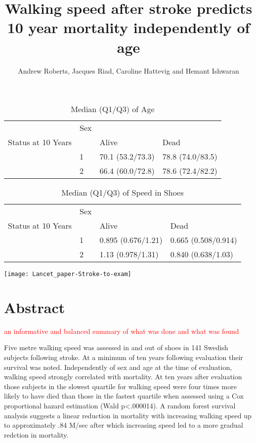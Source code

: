 \documentclass[a4paper,12pt]{article}
\author{Andrew Roberts, Jacques Riad, Caroline Hattevig and Hemant Ishwaran}
\title{Walking speed after stroke predicts 10 year mortality independently of age}
\begin{document}
\maketitle
\newpage


\begin{table}[ht]
\centering
\caption{Median (Q1/Q3) of Age} 
\begin{tabular}{llll}
  \hline
  \hline
 & Sex &  &  \\ 
  Status at 10 Years &  & Alive & Dead \\ 
   & 1 & 70.1 (53.2/73.3) & 78.8 (74.0/83.5) \\ 
   & 2 & 66.4 (60.0/72.8) & 78.6 (72.4/82.2) \\ 
   \hline
\end{tabular}
\end{table}%
\begin{table}[ht]
\centering
\caption{Median (Q1/Q3) of Speed in Shoes} 
\begin{tabular}{llll}
  \hline
  \hline
 & Sex &  &  \\ 
  Status at 10 Years &  & Alive & Dead \\ 
   & 1 & 0.895 (0.676/1.21) & 0.665 (0.508/0.914) \\ 
   & 2 & 1.13 (0.978/1.31) & 0.840 (0.638/1.03) \\ 
   \hline
\end{tabular}
\end{table}\texttt{[image: Lancet\_paper-Stroke-to-exam]}

\section{Abstract}  \textcolor{red}{an informative and balanced summary of what was done and what was found} 

Five metre walking speed was assessed in and out of shoes in 141 Swedish subjects following stroke. At a minimum of ten years following evaluation their survival was noted. Independently of sex and age at the time of evaluation, walking speed strongly correlated with mortality. At ten years after evaluation those subjects in the slowest quartile for walking speed were four times more likely to have died than those in the fastest quartile when assessed using a Cox proportional hazard estimation (Wald p<.000014). A random forest survival analysis suggests a linear reduction in mortality with increasing walking speed up to approximately .84 M/sec after which increasing speed led to a more gradual redction in mortality.
\end{document}
